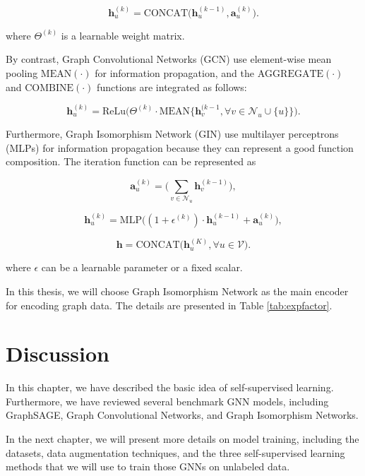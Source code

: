 \begin{equation}
\mathbf{h}_{u}^{(k)}={\text{CONCAT}\Big(\mathbf{h}_{u}^{(k-1)}, \textbf{a}_{u}^{(k)}\Big)}.
\end{equation}

where $\Theta^{(k)}$ is a learnable weight matrix.

By contrast, Graph Convolutional Networks (GCN) \cite{GCN} use element-wise mean pooling $\text{MEAN}(\cdot)$ for information propagation, and the $\text{AGGREGATE}(\cdot)$ and $\text{COMBINE}(\cdot)$ functions are integrated as follows:

\begin{equation}
\mathbf{h}_{u}^{(k)}=\text{ReLu}\Big(\Theta^{(k)}\cdot\text{MEAN}\Big\{\mathbf{h}_{v}^{(k-1}, \forall v\in\mathcal{N}_{u}\cup\{u\}\Big\}\Big).
\end{equation}

Furthermore, Graph Isomorphism Network (GIN) \cite{GIN} use multilayer perceptrons (MLPs) for information propagation because they can represent a good function composition. The iteration function can be represented as

\begin{equation}
\textbf{a}_{u}^{(k)}=\Big(\sum_{v\in\mathcal{N}_{u}}\mathbf{h}_{v}^{(k-1)}\Big),
\end{equation}

\begin{equation}
\mathbf{h}_{u}^{(k)}=\text{MLP}\Big((1+\epsilon^{(k)})\cdot\mathbf{h}_{u}^{(k-1)}+\textbf{a}_{u}^{(k)}\Big),
\end{equation}

\begin{equation}
\textbf{h} = \text{CONCAT}\Big( \mathbf{h}_{u}^{(K)}, \forall u \in \mathcal{V} \Big).
\end{equation}

where $\epsilon$ can be a learnable parameter or a fixed scalar. 

In this thesis, we will choose Graph Isomorphism Network as the main encoder for encoding graph data. The details are presented in Table  \ref{tab:expfactor}.



\section{Discussion}

In this chapter, we have described the basic idea of self-supervised learning. Furthermore, we have reviewed several benchmark GNN models, including GraphSAGE, Graph Convolutional Networks, and Graph Isomorphism Networks. 

In the next chapter, we will present more details on model training, including the datasets, data augmentation techniques, and the three self-supervised learning methods that we will use to train those GNNs on unlabeled data.










